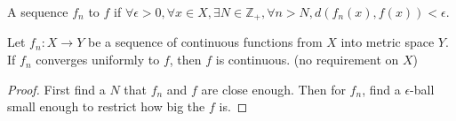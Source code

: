 \begin{definition}
    A sequence $f_n$  to $f$ if $\forall \epsilon > 0,\forall x \in X, \exists N \in \mathbb{Z}_{+}, \forall n > N, d \left( f_n (x) , f(x) \right) < \epsilon$.
\end{definition}

\begin{theorem}
    Let $f_n: X \rightarrow Y$ be a sequence of continuous functions from $X$ into metric space $Y$. If $f_n$ converges uniformly to $f$, then $f$ is continuous. (no requirement on $X$)
\end{theorem}
\begin{proof}
    First find a $N$ that $f_n$ and $f$ are close enough. Then for $f_n$, find a $\epsilon$-ball small enough to restrict how big the $f$ is.
\end{proof}











